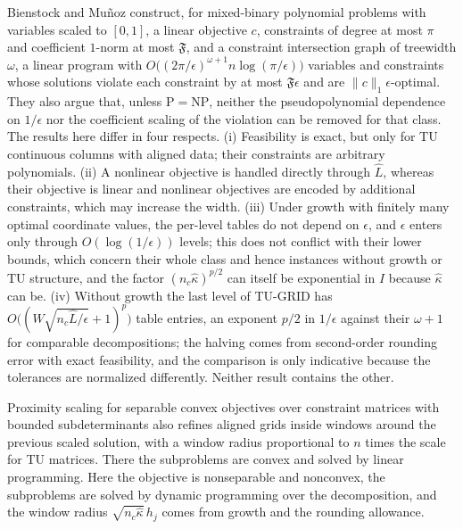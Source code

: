 \begin{remark}\label{rem:tu-bm}
Bienstock and Mu\~noz \cite[Theorems~4 and~15]{BienstockMunoz2018} construct,
for mixed-binary polynomial problems with variables scaled to $[0,1]$, a linear
objective $c$, constraints of degree at most $\pi$ and coefficient $1$-norm at
most $\mathfrak F$, and a constraint intersection graph of treewidth $\omega$, a
linear program with $O\bigl((2\pi/\epsilon)^{\omega+1}n\log(\pi/\epsilon)\bigr)$
variables and constraints whose solutions violate each constraint by at most
$\mathfrak F\epsilon$ and are $\lVert c\rVert_1\epsilon$-optimal. They also argue that,
unless $\mathrm P=\mathrm{NP}$, neither the pseudopolynomial dependence on
$1/\epsilon$ nor the coefficient scaling of the violation can be removed for that
class. The results here differ in four respects. (i) Feasibility is exact, but
only for TU continuous columns with aligned data; their constraints are
arbitrary polynomials. (ii) A nonlinear objective is handled directly through
$\hat L$, whereas their objective is linear and nonlinear objectives are
encoded by additional constraints, which may increase the width. (iii) Under
growth with finitely many optimal coordinate values, the per-level tables do
not depend on $\epsilon$, and $\epsilon$ enters only through $O(\log(1/\epsilon))$ levels;
this does not conflict with their lower bounds, which concern their whole
class and hence instances without growth or TU structure, and the factor
$(n_c\hat\kappa)^{p/2}$ can itself be exponential in $I$ because $\hat\kappa$ can be. (iv) Without growth the last level of
TU-GRID has $O\bigl((W\sqrt{n_c\hat L/\epsilon}+1)^p\bigr)$ table entries, an exponent
$p/2$ in $1/\epsilon$ against their $\omega+1$ for comparable decompositions; the
halving comes from second-order rounding error with exact feasibility, and
the comparison is only indicative because the tolerances are normalized
differently. Neither result contains the other.

Proximity scaling for separable convex objectives over constraint matrices
with bounded subdeterminants \cite{HochbaumShanthikumar1990} also refines
aligned grids inside windows around the previous scaled solution, with a
window radius proportional to $n$ times the scale for TU matrices. There the
subproblems are convex and solved by linear programming. Here the objective is
nonseparable and nonconvex, the subproblems are solved by dynamic programming
over the decomposition, and the window radius $\sqrt{n_c\hat\kappa}\,h_j$ comes
from growth and the rounding allowance.
\end{remark}

